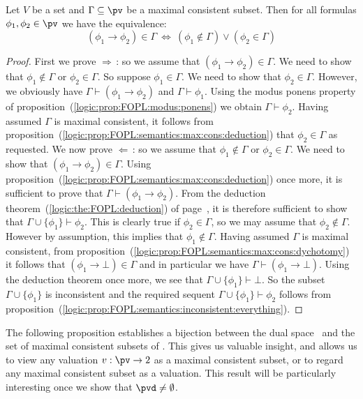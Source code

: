 \begin{prop}\label{logic:prop:FOPL:max:cons:implication:charac}
Let $V$ be a set and $\Gamma\subseteq\pv$ be a maximal consistent
subset. Then for all formulas $\phi_{1},\phi_{2}\in\pv$ we have the
equivalence:
    \[
    (\phi_{1}\to\phi_{2})\in\Gamma\ \Leftrightarrow\
    (\phi_{1}\not\in\Gamma)\lor(\phi_{2}\in\Gamma)
    \]
\end{prop}
\begin{proof}
First we prove $\Rightarrow$\,: so we assume that
$(\phi_{1}\to\phi_{2})\in\Gamma$. We need to show that
$\phi_{1}\not\in\Gamma$ or $\phi_{2}\in\Gamma$. So suppose
$\phi_{1}\in\Gamma$. We need to show that $\phi_{2}\in\Gamma$.
However, we obviously have $\Gamma\vdash(\phi_{1}\to\phi_{2})$ and
$\Gamma\vdash\phi_{1}$. Using the modus ponens property of
proposition~(\ref{logic:prop:FOPL:modus:ponens}) we obtain
$\Gamma\vdash\phi_{2}$. Having assumed $\Gamma$ is maximal
consistent, it follows from
proposition~(\ref{logic:prop:FOPL:semantics:max:cons:deduction})
that $\phi_{2}\in\Gamma$ as requested. We now prove $\Leftarrow$\,:
so we assume that $\phi_{1}\not\in\Gamma$ or $\phi_{2}\in\Gamma$. We
need to show that $(\phi_{1}\to\phi_{2})\in\Gamma$. Using
proposition~(\ref{logic:prop:FOPL:semantics:max:cons:deduction})
once more, it is sufficient to prove that
$\Gamma\vdash(\phi_{1}\to\phi_{2})$. From the deduction
theorem~(\ref{logic:the:FOPL:deduction}) of
page~\pageref{logic:the:FOPL:deduction}, it is therefore sufficient
to show that $\Gamma\cup\{\phi_{1}\}\vdash\phi_{2}$. This is clearly
true if $\phi_{2}\in\Gamma$, so we may assume that
$\phi_{2}\not\in\Gamma$. However by assumption, this implies that
$\phi_{1}\not\in\Gamma$. Having assumed $\Gamma$ is maximal
consistent, from
proposition~(\ref{logic:prop:FOPL:semantics:max:cons:dychotomy}) it
follows that $(\phi_{1}\to\bot)\in\Gamma$ and in particular we have
$\Gamma\vdash(\phi_{1}\to\bot)$. Using the deduction theorem once
more, we see that $\Gamma\cup\{\phi_{1}\}\vdash\bot$. So the subset
$\Gamma\cup\{\phi_{1}\}$ is inconsistent and the required sequent
$\Gamma\cup\{\phi_{1}\}\vdash\phi_{2}$ follows from
proposition~(\ref{logic:prop:FOPL:semantics:inconsistent:everything}).
\end{proof}

The following proposition establishes a bijection between the dual
space \pvd\ and the set of maximal consistent subsets of \pv. This
gives us valuable insight, and allows us to view any valuation
$v:\pv\to 2$ as a maximal consistent subset, or to regard any
maximal consistent subset as a valuation. This result will be
particularly interesting once we show that $\pvd\neq\emptyset$.

